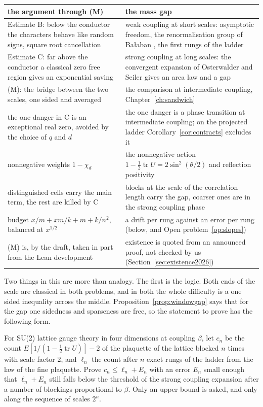 \begin{center}
\small
\begin{tabular}{p{}p{}}
\toprule
the argument through (M) & the mass gap \\ \midrule
Estimate B: below the conductor the characters behave like random signs, square root cancellation & weak coupling at short scales: asymptotic freedom, the renormalisation group of Ba\l aban \cite{Ba87}, the first rungs of the ladder \\
Estimate C: far above the conductor a classical zero free region gives an exponential saving & strong coupling at long scales: the convergent expansion of Osterwalder and Seiler \cite{OSe} gives an area law and a gap \\
(M): the bridge between the two scales, one sided and averaged & the comparison at intermediate coupling, Chapter~\ref{ch:sandwich} \\
the one danger in C is an exceptional real zero, avoided by the choice of $q$ and $d$ & the one danger is a phase transition at intermediate coupling; on the projected ladder Corollary~\ref{cor:contracts} excludes it \\
nonnegative weights $1-\chi_d$ & the nonnegative action $1-\frac12\operatorname{tr}U=2\sin^2(\theta/2)$ and reflection positivity \\
distinguished cells carry the main term, the rest are killed by C & blocks at the scale of the correlation length carry the gap, coarser ones are in the strong coupling phase \\
budget $x/m+xm/k+m+k/n^2$, balanced at $x^{1/2}$ & a drift per rung against an error per rung (below, and Open problem~\ref{op:slopes}) \\
(M) is, by the draft, taken in part from the Lean development & existence is quoted from an announced proof, not checked by us (Section~\ref{sec:existence2026}) \\
\bottomrule
\end{tabular}
\end{center}

Two things in this are more than analogy. The first is the logic. Both ends of the scale are classical in both problems, and in both the whole difficulty is a one sided inequality across the middle. Proposition~\ref{prop:windowgap} says that for the gap one sidedness and sparseness are free, so the statement to prove has the following form.

\begin{problem}\label{op:MYM}
For SU(2) lattice gauge theory in four dimensions at coupling $\beta$, let $c_n$ be the count $E[1/(1-\frac12\operatorname{tr}U)]-2$ of the plaquette of the lattice blocked $n$ times with scale factor $2$, and $\ell_n$ the count after $n$ exact rungs of the ladder from the law of the fine plaquette. Prove $c_n\le\ell_n+E_n$ with an error $E_n$ small enough that $\ell_n+E_n$ still falls below the threshold of the strong coupling expansion after a number of blockings proportional to $\beta$. Only an upper bound is asked, and only along the sequence of scales $2^n$.
\end{problem}

